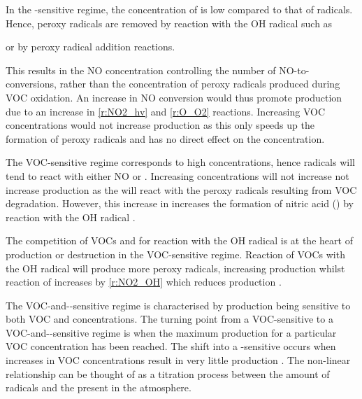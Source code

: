 In the -sensitive regime, the concentration of  is low compared to that of radicals. 
Hence, peroxy radicals are removed by reaction with the OH radical such as 
\begin{rxnarray}
     \rightarrow {} \label{r:HO2_OH}
\end{rxnarray}
or by peroxy radical addition reactions.

This results in the NO concentration controlling the number of NO-to- conversions, rather than the concentration of peroxy radicals produced during VOC oxidation. 
An increase in NO conversion would thus promote  production due to an increase in \eqref{r:NO2_hv} and \eqref{r:O_O2} reactions. 
Increasing VOC concentrations would not increase  production as this only speeds up the formation of peroxy radicals and has no direct effect on the  concentration.

The VOC-sensitive regime corresponds to high  concentrations, hence radicals will tend to react with either NO or . 
Increasing  concentrations will not increase not increase  production as the  will react with the peroxy radicals resulting from VOC degradation. 
However, this increase in  increases the formation of nitric acid () by reaction with the OH radical \citep{Kleinman:1991, Kleinman:1994, Kirchner:2001}.
\begin{rxnarray}
     \rightarrow {} \label{r:NO2_OH}
\end{rxnarray}
The competition of VOCs and  for reaction with the OH radical is at the heart of  production or destruction in the VOC-sensitive regime. 
Reaction of VOCs with the OH radical will produce more peroxy radicals, increasing  production whilst reaction of  increases  by \eqref{r:NO2_OH} which reduces  production \citep{Kleinman:1991, Kleinman:1994, Kirchner:2001}.

The VOC-and--sensitive regime is characterised by  production being sensitive to both VOC and  concentrations. 
The turning point from a VOC-sensitive to a VOC-and--sensitive regime is when the maximum  production for a particular VOC concentration has been reached. 
The shift into a -sensitive occurs when increases in VOC concentrations result in very little  production \citep{Kirchner:2001}. 
The non-linear relationship can be thought of as a titration process between the amount of radicals and the  present in the atmosphere.

